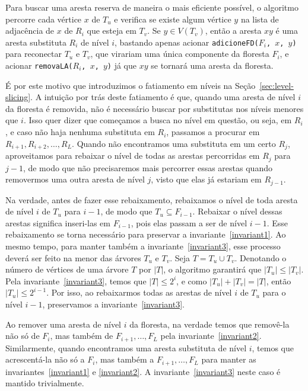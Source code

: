 Para buscar uma aresta reserva de maneira o mais eficiente possível, o algoritmo percorre cada vértice $x$ de $T_u$ e verifica se existe algum vértice $y$ na lista de adjacência de $x$ de $R_i$ que esteja em $T_v$. Se $y \in V(T_v)$, então a aresta $xy$ é uma aresta substituta $R_i$ de nível $i$, bastando apenas acionar \texttt{adicioneFD($F_i$, $x$, $y$)} para reconectar $T_u$ e $T_v$, que virariam uma única componente da floresta $F_i$, e acionar \texttt{removaLA($R_i$, $x$, $y$)} já que $xy$ se tornará uma aresta da floresta.

É por este motivo que introduzimos o fatiamento em níveis na Seção~\ref{sec:level-slicing}. A intuição por trás deste fatiamento é que, quando uma aresta de nível $i$ da floresta é removida, não é necessário buscar por substitutas nos níveis menores que $i$. Isso quer dizer que começamos a busca no nível em questão, ou seja, em $R_i$, e caso não haja nenhuma substituta em $R_i$, passamos a procurar em $R_{i+1}, R_{i + 2}, \ldots, R_L$. Quando não encontramos uma substituta em um certo $R_j$, aproveitamos para rebaixar o nível de todas as arestas percorridas em $R_j$ para $j - 1$, de modo que não precisaremos mais percorrer essas arestas quando removermos uma outra aresta de nível $j$, visto que elas já estariam em $R_{j-1}$.


Na verdade, antes de fazer esse rebaixamento, rebaixamos o nível de toda aresta de nível $i$ de $T_u$ para $i-1$, de modo que $T_u \subseteq F_{i-1}$.
Rebaixar o nível dessas arestas significa inseri-las em $F_{i-1}$, pois elas passam a ser de nível $i-1$. Esse rebaixamento se torna necessário para preservar a invariante~\ref{invariant1}. Ao mesmo tempo, para manter também a invariante~\ref{invariant3}, esse processo deverá ser feito na menor das árvores $T_u$ e $T_v$. Seja $T = T_u \cup T_v$. Denotando o número de vértices de uma árvore $T$ por $|T|$, o algoritmo garantirá que $|T_u| \leq |T_v|$. Pela invariante~\ref{invariant3}, temos que $|T| \leq 2^i$, e como $|T_u| + |T_v| = |T|$, então $|T_u| \leq 2^{i-1}$. Por isso, ao rebaixarmos todas as arestas de nível $i$ de $T_u$ para o nível $i-1$, preservamos a invariante~\ref{invariant3}. 

Ao remover uma aresta de nível $i$ da floresta, na verdade temos que removê-la não só de $F_i$, mas também de $F_{i + 1}, \ldots, F_{L}$ pela invariante~\ref{invariant2}. Similarmente, quando encontramos uma aresta substituta de nível $i$, temos que acrescentá-la não só a $F_i$, mas também a $F_{i+1}, \ldots, F_{L}$ para manter as invariantes~\ref{invariant1} e \ref{invariant2}. A invariante~\ref{invariant3} neste caso é mantido trivialmente.

